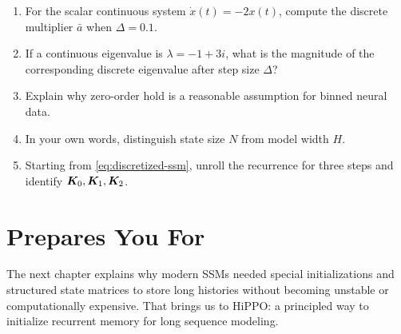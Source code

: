 \begin{enumerate}
  \item For the scalar continuous system $\dot{x}(t)=-2x(t)$, compute the discrete
  multiplier $\bar{a}$ when $\Delta=0.1$.
  \item If a continuous eigenvalue is $\lambda=-1+3i$, what is the magnitude of the
  corresponding discrete eigenvalue after step size $\Delta$?
  \item Explain why zero-order hold is a reasonable assumption for binned neural data.
  \item In your own words, distinguish state size $N$ from model width $H$.
  \item Starting from \eqref{eq:discretized-ssm}, unroll the recurrence for three steps
  and identify $\bm{K}_0,\bm{K}_1,\bm{K}_2$.
\end{enumerate}

\section{Prepares You For}

The next chapter explains why modern SSMs needed special initializations and structured
state matrices to store long histories without becoming unstable or computationally
expensive. That brings us to HiPPO: a principled way to initialize recurrent memory for
long sequence modeling.
